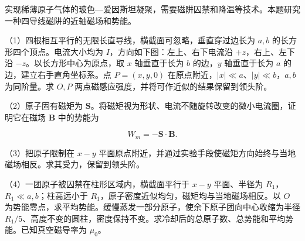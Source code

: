 \documentclass[12pt,a4paper,fontset=fandol]{ctexart}
\begin{document}
实现稀薄原子气体的玻色---爱因斯坦凝聚，需要磁阱囚禁和降温等技术。本题研究一种四导线磁阱的近轴磁场和势能。

（1）四根相互平行的无限长直导线，横截面可忽略，垂直穿过边长为 \(a,b\)
的长方形四个顶点。电流大小均为 \(I\)，方向如下图：左上、右下电流沿
\(+z\)，右上、左下沿 \(-z\)。以长方形中心为原点，取 \(x\) 轴垂直于长为
\(b\) 的边，\(y\) 轴垂直于长为 \(a\) 的边，建立右手直角坐标系。点
\(P=(x,y,0)\) 在原点附近，\(|x|\ll a\)、\(|y|\ll b\)，\(a,b\)
为同阶量。求 \(O,P\) 两点磁感应强度，并将可作近似的结果保留到领头阶。

\begin{center}
\begin{minipage}{\linewidth}
\centering\begingroup
{}
\ifdim\wd\diagrambox>.88\linewidth
\sbox{\diagrambox}{\resizebox{.88\linewidth}{!}{\usebox{\diagrambox}}}
\fi
\ifdim\ht\diagrambox>.40\textheight
\resizebox{!}{.40\textheight}{\usebox{\diagrambox}}
\else\usebox{\diagrambox}\fi
\par{}
\endgroup\end{minipage}
\end{center}

（2）原子固有磁矩为
\(\boldsymbol S\)。将磁矩视为形状、电流不随旋转改变的微小电流圈，证明它在磁场
\(\boldsymbol B\) 中的势能为

\[W_m=-\boldsymbol S\cdot\boldsymbol B.\]

（3）把原子限制在 \(x-y\)
平面原点附近，并通过实验手段使磁矩方向始终与当地磁场相反。求其受力，保留到领头阶。

（4）一团原子被囚禁在柱形区域内，横截面平行于 \(x-y\) 平面、半径为
\(R_1\)，\(R_1\ll a,b\)；柱高远小于
\(R_1\)，原子密度近似均匀，磁矩均与当地磁场相反。以 \(O\)
为势能零点，求平均势能。缓慢蒸发一部分原子，使余下原子团向中心收缩为半径
\(R_1/5\)、高度不变的圆柱，密度保持不变。求冷却后的总原子数、总势能和平均势能。已知真空磁导率为
\(\mu_0\)。
\end{document}
